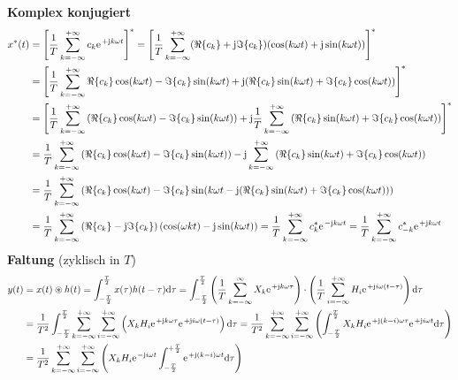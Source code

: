 \documentclass[11pt,a4paper,DIV=12]{scrartcl}
\newcommand{\diff}{\mathrm{d}}
\begin{document}
\textbf{Komplex konjugiert}
\begin{align}
	x^*(t)&=\left [\frac{1}{T}\sum_{k=-\infty}^{+\infty}c_k\e^{+\im k \omega t}\right ]^*=\left [\frac{1}{T}\sum_{k=-\infty}^{+\infty}(\Re\{c_k\}+\im\Im\{c_k\})(\cos(k\omega t)+\im\sin(k\omega t))\right ]^*\nonumber \\
	&=\left [\frac{1}{T}\sum_{k=-\infty}^{+\infty}\Re\{c_k\}\cos(k\omega t)-\Im\{c_k\}\sin(k\omega t)+\im (\Re\{c_k\}\sin(k\omega t)+\Im\{c_k\}\cos(k\omega t)) \right ]^*\nonumber \\
	&=\left [\frac{1}{T}\sum_{k=-\infty}^{+\infty}\left (\Re\{c_k\}\cos(k\omega t)-\Im\{c_k\}\sin(k\omega t)\right )+\im\frac{1}{T}\sum_{k=-\infty}^{+\infty}\left (\Re\{c_k\}\sin(k\omega t)+\Im\{c_k\}\cos(k\omega t)\right )\right ]^*\nonumber \\
	&=\frac{1}{T}\sum_{k=-\infty}^{+\infty}\left (\Re\{c_k\}\cos(k\omega t)-\Im\{c_k\}\sin(k\omega t)\right )-\im\sum_{k=-\infty}^{+\infty}\left (\Re\{c_k\}\sin(k\omega t)+\Im\{c_k\}\cos(k\omega t)\right )\nonumber \\
	&=\frac{1}{T}\sum_{k=-\infty}^{+\infty}\left (\Re\{c_k\}\cos(k\omega t)-\Im\{c_k\}\sin(k\omega t-\im(\Re\{c_k\}\sin(k\omega t)+\Im\{c_k\}\cos(k\omega t))\right )\nonumber \\
	&=\frac{1}{T}\sum_{k=-\infty}^{+\infty}\left(\Re\{c_k\}-\im\Im\{c_k\}\right)\left(\cos(\omega k t)-\im\sin(k\omega t) \right)=\frac{1}{T}\sum_{k=-\infty}^{+\infty}c_k^*\e^{-\im k \omega t}
	= \frac{1}{T}\sum_{k=-\infty}^{+\infty}c_{-k}^*\e^{+\im k \omega t}
\end{align}
\textbf{Faltung} (zyklisch in $T$)
\begin{align}
	y(t)&=x(t)\circledast h(t)
	=\int_{-\frac{T}{2}}^{\frac{T}{2}}x(\tau)h(t-\tau)\diff \tau
	=\int_{-\frac{T}{2}}^{\frac{T}{2}}\left (\frac{1}{T}\sum_{k=-\infty}^{\infty}X_k\e^{+\im k \omega \tau}\right )\cdot \left (\frac{1}{T}\sum_{i=-\infty}^{+\infty}H_i\e^{+\im i \omega (t-\tau)}\right )\diff \tau\nonumber \\
	&=\frac{1}{T^2}\int_{-\frac{T}{2}}^{\frac{T}{2}}\sum_{k=-\infty}^{+\infty}\sum_{i=-\infty}^{+\infty}\left (X_kH_i\e^{+\im k \omega \tau}\e^{+\im i \omega (t-\tau)}\right )\diff \tau
	=\frac{1}{T^2}\sum_{k=-\infty}^{+\infty}\sum_{i=-\infty}^{+\infty}\left (\int_{-\frac{T}{2}}^{\frac{T}{2}}X_kH_i\e^{+\im (k-i) \omega \tau}\e^{+\im i \omega t}\diff \tau\right )\nonumber \\
	&=\frac{1}{T^2}\sum_{k=-\infty}^{+\infty}\sum_{i=-\infty}^{+\infty}\left (X_kH_i\e^{-\im i \omega t}\int_{-\frac{T}{2}}^{+\frac{T}{2}}\e^{+\im (k-i)\omega t}\diff \tau \right )
\end{align}
\end{document}
